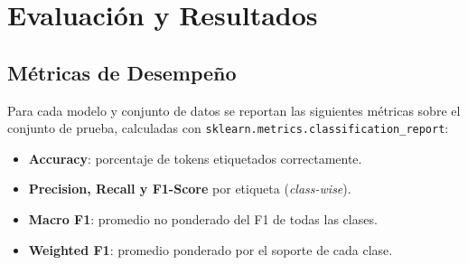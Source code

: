 \documentclass[12pt, a4paper]{article}
\begin{document}
\begin{table}[H]
    \centering
    \caption{Mejores configuraciones de hiperparámetros encontradas mediante Grid Search.}
    \label{tab:best_hyperparams}
\end{table}

\section{Evaluación y Resultados}

\subsection{Métricas de Desempeño}

Para cada modelo y conjunto de datos se reportan las siguientes métricas sobre
el conjunto de prueba, calculadas con \texttt{sklearn.metrics.classification\_report}:

\begin{itemize}
    \item \textbf{Accuracy}: porcentaje de tokens etiquetados correctamente.
    \item \textbf{Precision, Recall y F1-Score} por etiqueta (\textit{class-wise}).
    \item \textbf{Macro F1}: promedio no ponderado del F1 de todas las clases.
    \item \textbf{Weighted F1}: promedio ponderado por el soporte de cada clase.
\end{itemize}
\end{document}
